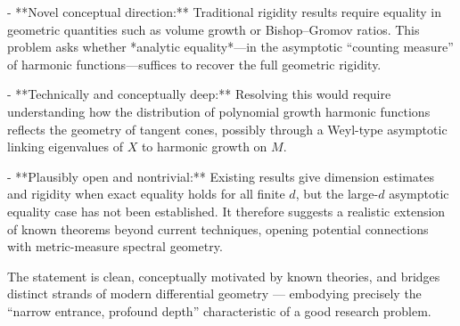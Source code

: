 - **Novel conceptual direction:**  
  Traditional rigidity results require equality in geometric quantities such as volume growth or Bishop–Gromov ratios. This problem asks whether *analytic equality*—in the asymptotic “counting measure” of harmonic functions—suffices to recover the full geometric rigidity.  

- **Technically and conceptually deep:**  
  Resolving this would require understanding how the distribution of polynomial growth harmonic functions reflects the geometry of tangent cones, possibly through a Weyl-type asymptotic linking eigenvalues of \(X\) to harmonic growth on \(M\).  

- **Plausibly open and nontrivial:**  
  Existing results give dimension estimates and rigidity when exact equality holds for all finite \(d\), but the large-\(d\) asymptotic equality case has not been established. It therefore suggests a realistic extension of known theorems beyond current techniques, opening potential connections with metric-measure spectral geometry.  

The statement is clean, conceptually motivated by known theories, and bridges distinct strands of modern differential geometry — embodying precisely the “narrow entrance, profound depth” characteristic of a good research problem.